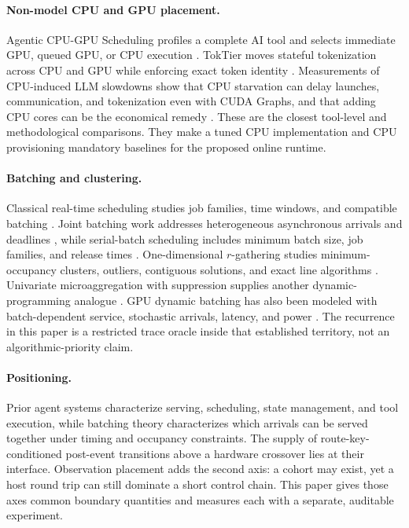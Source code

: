 \paragraph{Non-model CPU and GPU placement.}
Agentic CPU-GPU Scheduling profiles a complete AI tool and selects immediate
GPU, queued GPU, or CPU execution \cite{lu2026agenticcpugpu}. TokTier moves
stateful tokenization across CPU and GPU while enforcing exact token identity
\cite{zhang2026toktier}. Measurements of CPU-induced LLM slowdowns show that
CPU starvation can delay launches, communication, and tokenization even with
CUDA Graphs, and that adding CPU cores can be the economical remedy
\cite{chung2026cpuslowdowns}. These are the closest tool-level and methodological
comparisons. They make a tuned CPU implementation and CPU provisioning
mandatory baselines for the proposed online runtime.

\paragraph{Batching and clustering.}
Classical real-time scheduling studies job families, time windows, and
compatible batching \cite{barnoy2009throughput}. Joint batching work addresses
heterogeneous asynchronous arrivals and deadlines \cite{cang2024jointbatching},
while serial-batch scheduling includes minimum batch size, job families, and
release times \cite{huertas2025serialbatch}. One-dimensional $r$-gathering
studies minimum-occupancy clusters, outliers, contiguous solutions, and exact
line algorithms \cite{aggarwal2010anonymity,akagi2015rgather,
nakano2019rgather,sarker2021rgather}. Univariate microaggregation with
suppression supplies another dynamic-programming analogue
\cite{laszlo2013microaggregation}. GPU dynamic batching has also been modeled
with batch-dependent service, stochastic arrivals, latency, and power
\cite{xu2023smdpbatching}. The recurrence in this paper is a restricted trace
oracle inside that established territory, not an algorithmic-priority claim.

\paragraph{Positioning.}
Prior agent systems characterize serving, scheduling, state management, and
tool execution, while batching theory characterizes which arrivals can be
served together under timing and occupancy constraints. The supply of
route-key-conditioned post-event transitions above a hardware crossover lies
at their interface. Observation placement adds the second axis: a cohort may
exist, yet a host round trip can still dominate a short control chain. This
paper gives those axes common boundary quantities and measures each with a
separate, auditable experiment.
